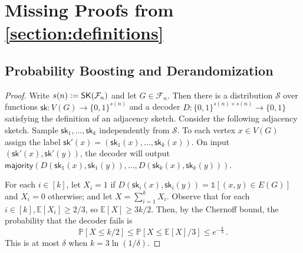 \documentclass{theoretics}
\newcommand{\Ex}[1]{\bE \left[ #1 \right]}
\renewcommand{\Pr}[1]{\bP \left[ #1 \right]} %
\newcommand{\define}{\vcentcolon=}
\newcommand{\ind}[1]{\mathds{1} \left[ #1 \right] }
\newcommand{\zo}{\{0,1\}}
\newcommand{\cF}{\ensuremath{\mathcal{F}}}
\newcommand{\cS}{\ensuremath{\mathcal{S}}}
\newcommand{\bE}{\ensuremath{\mathbb{E}}}
\newcommand{\bP}{\ensuremath{\mathbb{P}}}
\newcommand{\sk}{\mathsf{sk}}
\newcommand{\RL}{\mathsf{SK}}
\begin{document}
% 
% 


\printbibliography





\appendix

\section{Missing Proofs from \texorpdfstring{\cref{section:definitions}}{Section 3}}
\label{section:missing-proofs}

\subsection{Probability Boosting and Derandomization}
\propboosting*
\begin{proof}
Write $s(n) \define \RL(\cF_n)$ and let $G \in \cF_n$. Then there is a distribution $\cS$ over
functions $\sk : V(G) \to \zo^{s(n)}$ and a decoder $D : \zo^{s(n) \times s(n)} \to \zo$ satisfying
the definition of an adjacency sketch. Consider the following adjacency sketch.  Sample $\sk_1,
\dotsc, \sk_k$ independently from $\cS$. To each vertex $x \in V(G)$ assign the label $\sk'(x) =
(\sk_1(x), \dotsc, \sk_k(x))$. On input $(\sk'(x),\sk'(y))$, the decoder will output
$\mathsf{majority}(D(\sk_1(x), \sk_1(y)), \dotsc, D(\sk_k(x),\sk_k(y)))$.

For each $i \in [k]$, let $X_i = 1$ if $D(\sk_i(x),\sk_i(y)) = \ind{(x,y) \in E(G)}$ and $X_i = 0$
otherwise; and let $X = \sum_{i=1}^k X_i$.  Observe that for each $i \in [k], \Ex{X_i} \geq 2/3$,
so $\Ex{X} \geq 3k/2$. Then, by the Chernoff bound, the probability that the decoder fails is
\[
  \Pr{ X \leq k/2 }
  \leq \Pr{ X \leq \Ex{X}/3 }
  \leq e^{-\frac{k}{3}} \,.
\]
This is at most $\delta$ when $k = 3\ln(1/\delta)$.
\end{proof}
\end{document}
